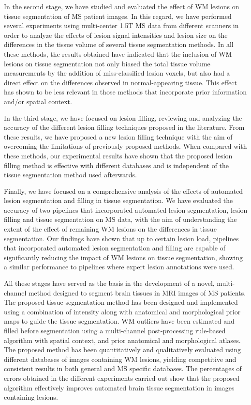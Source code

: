 In the second stage, we have studied and evaluated the effect of WM lesions on tissue segmentation of MS patient images. In this regard, we have performed several experiments using multi-center 1.5T MS data from different scanners in order to analyze the effects of lesion signal intensities and lesion size on the differences in the tissue volume of several tissue segmentation methods. In all these methods, the results obtained have indicated that the inclusion of WM lesions on tissue segmentation not only biased the total tissue volume measurements by the addition of miss-classified lesion voxels, but also had a direct effect on the differences observed in normal-appearing tissue. This effect has shown to be less relevant in those methods that incorporate prior information and/or spatial context. 

In the third stage, we have focused on lesion filling, reviewing and analyzing the accuracy of the different lesion filling techniques proposed in the literature. From these results, we have proposed a new lesion filling technique with the aim of overcoming the limitations of previously proposed methods. When compared with these methods, our experimental results have shown that the proposed lesion filling method is effective  with different databases and is independent of the tissue segmentation method used afterwards. 

Finally, we have focused on a comprehensive analysis of the effects of automated lesion segmentation and filling in tissue segmentation. We have evaluated the accuracy of two pipelines that incorporated automated lesion segmentation, lesion filling and tissue segmentation on MS data, with the aim of understanding the extent of the effect of remaining WM lesions on the differences in tissue segmentation. Our findings have shown that up to certain lesion load, pipelines that incorporated automated lesion segmentation and filling are capable of significantly reducing the impact of WM lesions on tissue segmentation, showing a similar performance to pipelines where expert lesion annotations were used.

All these stages have served as the basis in the development of a novel, multi-channel method designed to segment brain tissues in MRI images of MS patients. The proposed tissue segmentation method has been designed and implemented using a combination of intensity along with anatomical and morphological prior maps to guide the tissue segmentation. WM outliers have been estimated and filled before segmentation using a multi-channel post-processing rule-based algorithm with spatial context, and prior anatomical and morphological atlases. The proposed method has been quantitatively and qualitatively evaluated using different databases of images containing WM lesions, yielding competitive and consistent results in both general and MS specific databases. The percentages of errors obtained in the different experiments carried out show that the proposed algorithm effectively improves automated brain tissue segmentation in images containing lesions. 

